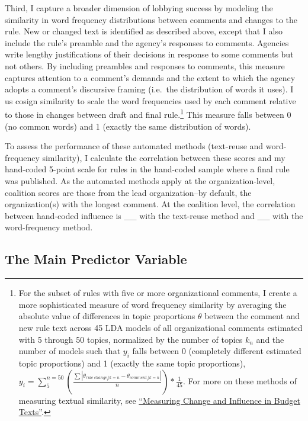 \documentclass[
      12pt,
        ]{article}
\begin{document}
Third, I capture a broader dimension of lobbying success by modeling the similarity in word frequency distributions between comments and changes to the rule. New or changed text is identified as described above, except that I also include the rule's preamble and the agency's responses to comments. Agencies write lengthy justifications of their decisions in response to some comments but not others. By including preambles and responses to comments, this measure captures attention to a comment's demands and the extent to which the agency adopts a comment's discursive framing (i.e.~the distribution of words it uses). I us cosign similarity to scale the word frequencies used by each comment relative to those in changes between draft and final rule.\footnote{For the subset of rules with five or more organizational comments, I create a more sophisticated measure of word frequency similarity by averaging the absolute value of differences in topic proportions \(\theta\) between the comment and new rule text across 45 LDA models of all organizational comments estimated with 5 through 50 topics, normalized by the number of topics \(k_n\) and the number of models such that \(y_i\) falls between 0 (completely different estimated topic proportions) and 1 (exactly the same topic proportions), \(y_i = \sum_{5}^{n=50}(\frac{\sum|\theta_{rule\ change_i|k=n}-\theta_{comment_i|k=n}|}{n})*\frac{1}{45}\). For more on these methods of measuring textual similarity, see \href{https://judgelord.github.io/budgets/JudgeLordAPSA2017.pdf}{``Measuring Change and Influence in Budget Texts''}.} This measure falls between 0 (no common words) and 1 (exactly the same distribution of words).

To assess the performance of these automated methods (text-reuse and word-frequency similarity), I calculate the correlation between these scores and my hand-coded 5-point scale for rules in the hand-coded sample where a final rule was published. As the automated methods apply at the organization-level, coalition scores are those from the lead organization--by default, the organization(s) with the longest comment. At the coalition level, the correlation between hand-coded influence is \_\_ with the text-reuse method and \_\_ with the word-frequency method.

\hypertarget{the-main-predictor-variable}{%
\subsection{The Main Predictor Variable}\label{the-main-predictor-variable}}
\end{document}
